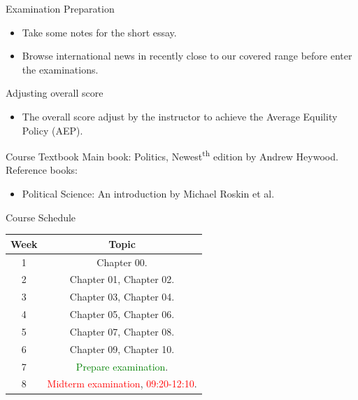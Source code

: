 \documentclass{beamer}
\begin{document}
\begin{frame}{Examination Preparation}
\begin{itemize}
\item Take some notes for the short essay.
\item Browse international news in recently close to our covered range before enter the examinations.
\end{itemize}
\begin{block}{Adjusting overall score}
\begin{itemize}
\item The overall score adjust by the instructor to achieve the Average Equility Policy (AEP).
\end{itemize}
\end{block}
\end{frame}
\begin{frame}{Course Textbook}
Main book: Politics, Newest\textsuperscript{th} edition by Andrew Heywood. \\
Reference books:
\begin{itemize}
\item Political Science: An introduction by Michael Roskin et al.
\end{itemize}
\end{frame}
\begin{frame}{Course Schedule}
\begin{center}
\begin{tabular}{|c|c|}
\hline
Week & Topic \\
\hline
1 & Chapter 00.\\
\hline
2 & Chapter 01, Chapter 02.\\
\hline
3 & Chapter 03, Chapter 04.\\
\hline
4 & Chapter 05, Chapter 06.\\
\hline
5 & Chapter 07, Chapter 08.\\
\hline
6 & Chapter 09, Chapter 10.\\
\hline
7 & \textcolor{Green}{Prepare examination}.\\
\hline
8 & \textcolor{red}{Midterm examination}, \textcolor{red}{09:20-12:10}.\\
\hline
\end{tabular}
\end{center}
\end{frame}
\end{document}
